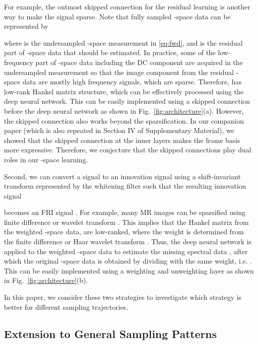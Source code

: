 \documentclass[10pt,journal]{IEEEtran}
\newcommand{\0}{{\boldsymbol{0}}}
\begin{document}
 For example, the outmost skipped connection for the residual learning is another way to make the signal sparse.
Note that  fully sampled -space data  can be represented by

where  is the undersampled -space measurement in \eqref{eq:fwd},
and  is the residual part of -space data that should be estimated.
In practice, some of the low-frequency part of -space data including the DC component
are acquired in the undersampled measurement so that the image component from the residual
-space data  are mostly high frequency signals, which are sparse. Therefore,
 has low-rank Hankel matrix structure, which can be effectively processed using the deep neural network.
This can be easily implemented using a skipped connection  before the deep neural network as shown in Fig.~\ref{fig:architecture}(a).
However, the skipped connection also works beyond the sparsification.  
In our companion paper \cite{ye2019cnn} (which is also repeated in Section IV of Supplementary Material), we showed that
the skipped connection at the inner layers makes the  frame basis more expressive.
Therefore,  we conjecture that the skipped connections play dual roles in our -space learning.

Second, we can  convert a signal to an innovation signal  using a 
 shift-invariant transform represented by the whitening filter  such that
 the resulting innovation signal
  
 becomes an FRI signal \cite{vetterli2002sampling}.  
  For example,  many MR images can be sparsified using finite difference or wavelet transform
 \cite{jin2016general}.  
 This implies that the Hankel matrix from the weighted -space data,
  are low-ranked, 
where the weight  is determined
  from the finite difference or Haar wavelet transform \cite{jin2016general,ye2016compressive}.
  Thus, the deep neural network is applied to the weighted -space data to estimate
  the missing  spectral data , after which the original -space data is obtained
  by dividing with the same weight, i.e. .
 This can be easily implemented using a weighting and unweighting layer as shown in Fig.~\ref{fig:architecture}(b).


In this paper, we consider these
two strategies to investigate which strategy is better for different sampling trajectories.

\subsection{Extension to General Sampling Patterns}
\end{document}
